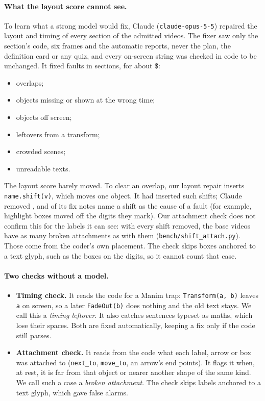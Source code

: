 \documentclass[11pt]{article}
\begin{document}
\paragraph{What the layout score cannot see.} To learn what a strong model would fix, Claude
(\texttt{claude-opus-5-5}) repaired the layout and timing of every section of the \AdmComplete{} admitted videos. The
fixer saw only the section's code, six frames and the automatic reports, never the plan, the definition card or any
quiz, and every on-screen string was checked in code to be unchanged. It fixed \ClaudeFaults{} faults in
\ClaudeSections{} sections, for about \$\ClaudeCost{}:
\begin{itemize}
  \item \ClaudeOverlap{} overlaps;
  \item \ClaudeOther{} objects missing or shown at the wrong time;
  \item \ClaudeOffScreen{} objects off screen;
  \item \ClaudeLeftover{} leftovers from a transform;
  \item \ClaudeCrowded{} crowded scenes;
  \item \ClaudeUnreadable{} unreadable texts.
\end{itemize}
The layout score barely moved. To clear an overlap, our layout repair inserts \texttt{name.shift(v)}, which moves
one object. It had inserted \ShiftsIn{} such shifts; Claude removed \ShiftsRemoved{}, and \ShiftNotes{} of its fix
notes name a shift as the cause of a fault (for example, highlight boxes moved off the digits they mark). Our
attachment check does not confirm this for the labels it can see: with every shift removed, the base videos have
as many broken attachments as with them (\texttt{bench/shift\_attach.py}). Those come from the coder's own
placement. The check skips boxes anchored to a text glyph, such as the boxes on the digits, so it cannot count that
case.

\paragraph{Two checks without a model.}
\begin{itemize}
  \item \textbf{Timing check.} It reads the code for a Manim trap: \texttt{Transform(a, b)} leaves \texttt{a} on
  screen, so a later \texttt{FadeOut(b)} does nothing and the old text stays. We call this a \emph{timing
  leftover}. It also catches sentences typeset as
  maths, which lose their spaces. Both are fixed automatically, keeping a fix only if the code still parses.
  \item \textbf{Attachment check.} It reads from the code what each label, arrow or box was attached to
  (\texttt{next\_to}, \texttt{move\_to}, an arrow's end points). It flags it when, at rest, it is far from that object
  or nearer another shape of the same kind. We call such a case a \emph{broken attachment}. The check skips labels
  anchored to a text glyph, which gave false alarms.
\end{itemize}
\end{document}
